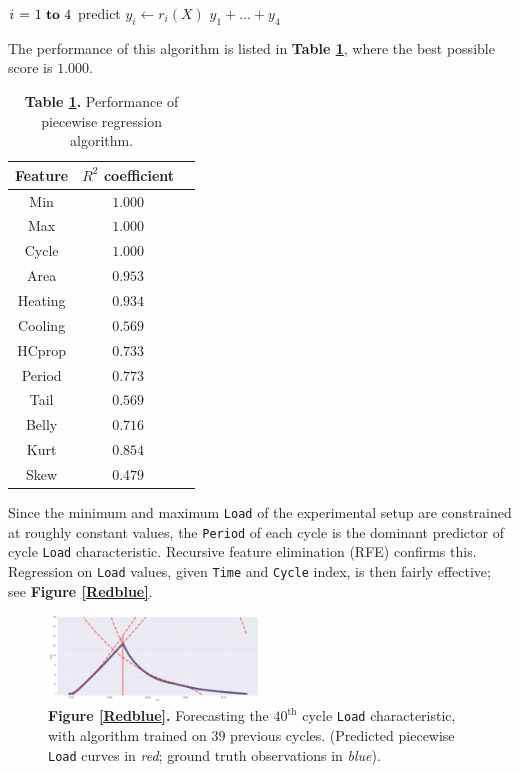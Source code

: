 \documentclass[letterpaper, 10 pt, conference]{ieeeconf}  %
\begin{document}
\begin{codebox}
  \li \For $i \gets 1 \To 4$ \Do
    \li predict $y_i \gets r_i(X)$
  \End
  \li \Return $y_1 + \dots + y_4$
\end{codebox}

The performance of this algorithm is listed in \textbf{Table \ref{Performance}}, where the best possible score is $1.000$.

\begin{table}[h]
  \centering
  \begin{tabular}{ c | c c }
    \textbf{Feature} & \textbf{$R^2$ coefficient} \\
    \hline
    Min & $1.000$ \\
    Max & $1.000$ \\
    Cycle & $1.000$ \\
    Area & $0.953$ \\
    Heating & $0.934$ \\
    Cooling & $0.569$ \\
    HCprop & $0.733$ \\
    Period & $0.773$ \\
    Tail & $0.569$ \\
    Belly & $0.716$ \\
    Kurt & $0.854$ \\
    Skew & $0.479$
  \end{tabular}
  \label{Performance}
  \caption*{\textbf{Table \ref{Performance}.} Performance of piecewise regression algorithm.}
\end{table}

Since the minimum and maximum \verb|Load| of the experimental setup are constrained at roughly constant values, the \verb|Period| of each cycle is the dominant predictor of cycle \verb|Load| characteristic. Recursive feature elimination (RFE) confirms this. Regression on \verb|Load| values, given \verb|Time| and \verb|Cycle| index, is then fairly effective; see \textbf{Figure \ref{Redblue}}.

\label{Redblue}
\begin{figure}[h]
	\centering
	\includegraphics[width=0.5\textwidth]{assets/piecewise_fit.png}
  \caption*{\textbf{Figure \ref{Redblue}.} Forecasting the $40^{\text{th}}$ cycle \texttt{Load} characteristic, with algorithm trained on $39$ previous cycles. (Predicted piecewise \texttt{Load} curves in \textit{red}; ground truth observations in \textit{blue}).}
\end{figure}
\end{document}

